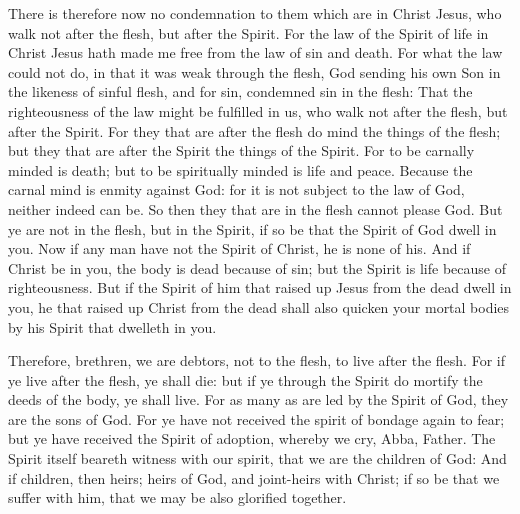  There is therefore now no condemnation to them which are
in Christ Jesus, who walk not after the flesh, but after the Spirit.
 For the law of the Spirit of life in Christ Jesus hath
made me free from the law of sin and death.  For what the
law could not do, in that it was weak through the flesh, God sending his
own Son in the likeness of sinful flesh, and for sin, condemned sin in
the flesh:  That the righteousness of the law might be
fulfilled in us, who walk not after the flesh, but after the Spirit.
 For they that are after the flesh do mind the things of
the flesh; but they that are after the Spirit the things of the Spirit.
 For to be carnally minded is death; but to be spiritually
minded is life and peace.  Because the carnal mind is
enmity against God: for it is not subject to the law of God, neither
indeed can be.  So then they that are in the flesh cannot
please God.  But ye are not in the flesh, but in the
Spirit, if so be that the Spirit of God dwell in you. Now if any man
have not the Spirit of Christ, he is none of his.  And if
Christ be in you, the body is dead because of sin; but the Spirit is
life because of righteousness.  But if the Spirit of him
that raised up Jesus from the dead dwell in you, he that raised up
Christ from the dead shall also quicken your mortal bodies by his Spirit
that dwelleth in you.

 Therefore, brethren, we are debtors, not to the flesh,
to live after the flesh.  For if ye live after the flesh,
ye shall die: but if ye through the Spirit do mortify the deeds of the
body, ye shall live.  For as many as are led by the
Spirit of God, they are the sons of God.  For ye have not
received the spirit of bondage again to fear; but ye have received the
Spirit of adoption, whereby we cry, Abba, Father.  The
Spirit itself beareth witness with our spirit, that we are the children
of God:  And if children, then heirs; heirs of God, and
joint-heirs with Christ; if so be that we suffer with him, that we may
be also glorified together.

